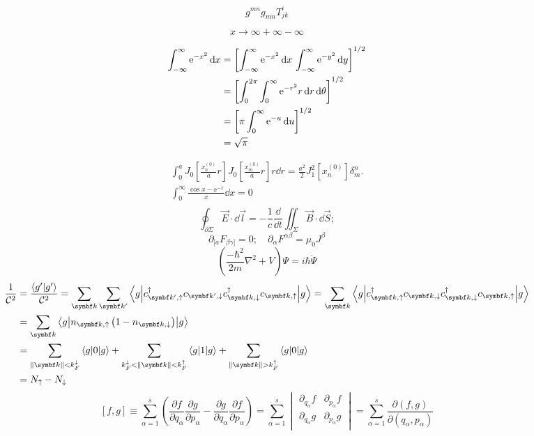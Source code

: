 \documentclass { article }
\begin{document}
\[ g^{mn} g_{mn} T^{i}_{jk} \]

\[ x \to \infty + \infty - \infty \]

\begin{align*}
     \int_{-\infty}^\infty \mathrm{e}^{-x^2} \dd{x}
  &= \qty[\int_{-\infty}^\infty \mathrm{e}^{-x^2} \dd{x} \, \int_{-\infty}^\infty \mathrm{e}^{-y^2} \dd{y}]^{1/2} \\
  &= \qty[\int_0^{2\pi} \int_0^\infty \mathrm{e}^{-r^2} r \dd{r}\dd{\theta}]^{1/2} \\
  &= \qty[\pi \int_0^\infty \mathrm{e}^{-u} \dd{u}]^{1/2} \\
  &= \sqrt{\pi}
\end{align*}


\begin{align*}
\int_{0}^aJ_0\left[\frac{x_n^{(0)}}{a}r\right]J_0\left[\frac{x_m^{(0)}}{a}r\right]r\dd{r}=\frac{a^2}{2}J_1^2[x_n^{(0)}]\delta_m^n.\\
\int_{0}^{\infty}\frac{\cos x-\ee^{-x}}{x}\dd{x}=0\\
\end{align*}
\[\oint_{\partial\Sigma}\vec E\cdot \dd{\vec{l}}=-\frac{1}{c}\frac{\dd}{\dd t}\iint_{\Sigma}\vec B \cdot \dd{\vec{S}};\]
\[\partial_{[a}F_{\beta\gamma]}=0;\quad \partial_\alpha F^{\alpha\beta}=\mu_0J^\beta\]
\[\left(\frac{-\hbar^2}{2m}\nabla^2+V\right)\Psi=i\hbar\dot{\Psi}\]
\[\begin{split}
\frac{1}{\mathcal{C}^2}&{}=\frac{\innerprod{g'}{g'}}{\mathcal{C}^2}=\sum_{\bm{k}}\sum_{\bm{k}'}\brakket{g}{c_{\bm{k}',\uparrow}^\dagger c_{\bm{k}',\downarrow} c_{\bm{k},\downarrow}^\dagger c_{\bm{k},\uparrow}}{g}=\sum_{\bm{k}}\brakket{g}{c_{\bm{k},\uparrow}^\dagger c_{\bm{k},\downarrow} c_{\bm{k},\downarrow}^\dagger c_{\bm{k},\uparrow}}{g}\\
&{}=\sum_{\bm{k}}\brakket{g}{n_{\bm{k},\uparrow}\left(1-n_{\bm{k},\downarrow}\right)}{g}\\
&{}=\sum_{\norm{\bm{k}}<k_F^\downarrow}\brakket{g}{0}{g}+\sum_{k_F^\downarrow<\norm{\bm{k}}<k_F^\uparrow}\brakket{g}{1}{g}+\sum_{\norm{\bm{k}}>k_F^\uparrow}\brakket{g}{0}{g}\\
&{}=N_\uparrow-N_\downarrow
\end{split}\]
\[\left[ f,g \right]\equiv \sum_{\alpha =1}^{s}{\left( \frac{\partial f}{\partial {{q}_{\alpha }}}\frac{\partial g}{\partial {{p}_{\alpha }}}-\frac{\partial g}{\partial {{q}_{\alpha }}}\frac{\partial f}{\partial {{p}_{\alpha }}} \right)}=\sum\limits_{\alpha =1}^{s}{\begin{vmatrix}
	\partial_{{q}_{\alpha }} f & \partial_{{p}_{\alpha }} f  \\
	\partial_{{q}_{\alpha }} g & \partial_{{p}_{\alpha }} g  \\
	\end{vmatrix} }=\sum\limits_{\alpha =1}^{s}{\frac{\partial \left( f,g \right)}{\partial \left( {{q}_{\alpha }},{{p}_{\alpha }} \right)}}\]
\end{document}
